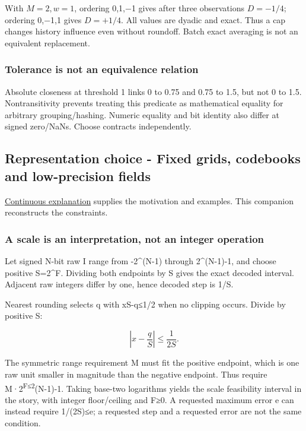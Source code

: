 With \(M=2,w=1\), ordering 0,1,−1 gives after three observations \(D=-1/4\); ordering 0,−1,1 gives \(D=+1/4\). All values are dyadic and exact. Thus a cap changes history influence even without roundoff. Batch exact averaging is not an equivalent replacement.

\subsubsection{Tolerance is not an equivalence relation}\label{tolerance-is-not-an-equivalence-relation}

Absolute closeness at threshold 1 links 0 to 0.75 and 0.75 to 1.5, but not 0 to 1.5. Nontransitivity prevents treating this predicate as mathematical equality for arbitrary grouping/hashing. Numeric equality and bit identity also differ at signed zero/NaNs. Choose contracts independently.

\subsection{Representation choice - Fixed grids, codebooks and low-precision fields}\label{representation-choice---fixed-grids-codebooks-and-low-precision-fields}

\hyperref[01-foundations-i-ch001]{Continuous explanation} supplies the motivation and examples. This companion reconstructs the constraints.

\subsubsection{A scale is an interpretation, not an integer operation}\label{a-scale-is-an-interpretation-not-an-integer-operation}

Let signed N-bit raw I range from -2\^{}(N-1) through 2\^{}(N-1)-1, and choose positive S=2\^{}F. Dividing both endpoints by S gives the exact decoded interval. Adjacent raw integers differ by one, hence decoded step is 1/S.

Nearest rounding selects q with \textbar xS-q\textbar≤1/2 when no clipping occurs. Divide by positive S:

\[
\left|x-\frac qS\right|\le\frac1{2S}.
\]

The symmetric range requirement M must fit the positive endpoint, which is one raw unit smaller in magnitude than the negative endpoint. Thus require M·2\textsuperscript{F≤2}(N-1)-1. Taking base-two logarithms yields the scale feasibility interval in the story, with integer floor/ceiling and F≥0. A requested maximum error e can instead require 1/(2S)≤e; a requested step and a requested error are not the same condition.

